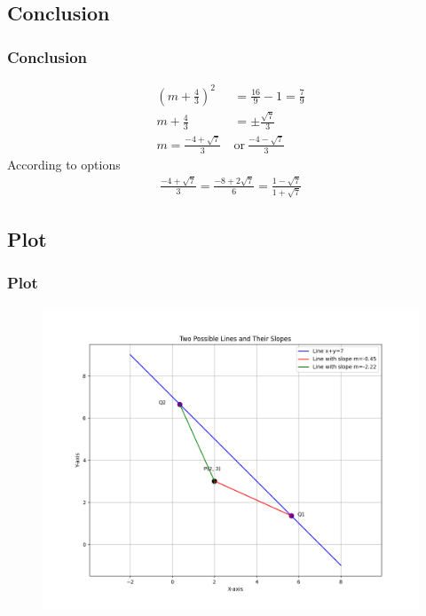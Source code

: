 \documentclass{beamer}
\providecommand{\brak}[1]{\ensuremath{\left(#1\right)}}
\theoremstyle{remark}
\numberwithin{equation}{section}
\begin{document}
\subsection{Conclusion}
\begin{frame}
\frametitle{Conclusion}
\begin{align}
\brak{m+\frac{4}{3}}^2&=\frac{16}{9}-1=\frac{7}{9} \\
m+\frac{4}{3}&=\pm\frac{\sqrt{7}}{3} \\
m=\frac{-4+\sqrt{7}}{3}\ &\text{or}\ \frac{-4-\sqrt{7}}{3}
\end{align}
According to options 
\begin{align}
    \frac{-4+\sqrt{7}}{3}=\frac{-8+2\sqrt{7}}{6}=\frac{1-\sqrt7}{1+\sqrt{7}}
\end{align}
\end{frame}
\subsection{Plot}
\begin{frame}[fragile]
\frametitle{Plot}

\begin{figure}[h!]
   \centering
   \includegraphics[width=0.7\columnwidth]{figs/fig1.png}
	\caption{}
   \label{}
\end{figure}
\end{frame}
\end{document}

